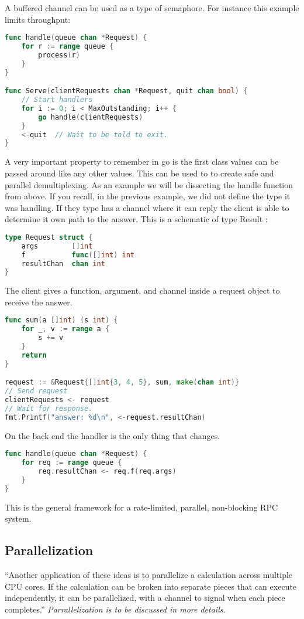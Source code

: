 	A buffered channel can be used as a type of semaphore. For instance this example limits throughput:
\begin{lstlisting}[language=Go]
func handle(queue chan *Request) {
    for r := range queue {
        process(r)
    }
}

func Serve(clientRequests chan *Request, quit chan bool) {
    // Start handlers
    for i := 0; i < MaxOutstanding; i++ {
        go handle(clientRequests)
    }
    <-quit  // Wait to be told to exit.
} 
\end{lstlisting}
A very important property to remember in go is the first class values can be passed around like any other values. This can be used to to create safe and parallel demultiplexing. As an example we will be dissecting the handle function from above. If you recall, in the previous example, we did not define the type it was handling. If they type has a channel where it can reply the client is able to determine it own path to the answer. This is a schematic of type Result :
\begin{lstlisting}[language=Go]
type Request struct {
    args        []int
    f           func([]int) int
    resultChan  chan int
} 
\end{lstlisting}
The client gives a function, argument, and channel inside a request object to receive the answer.
\begin{lstlisting}[language=Go]
func sum(a []int) (s int) {
    for _, v := range a {
        s += v
    }
    return
}

request := &Request{[]int{3, 4, 5}, sum, make(chan int)}
// Send request
clientRequests <- request
// Wait for response.
fmt.Printf("answer: %d\n", <-request.resultChan)
\end{lstlisting}
On the back end the handler is the only thing that changes. 
\begin{lstlisting}[language=Go]
func handle(queue chan *Request) {
    for req := range queue {
        req.resultChan <- req.f(req.args)
    }
} 
\end{lstlisting}
This is the general framework for a rate-limited, parallel, non-blocking RPC system.
\subsection{Parallelization}
“Another application of these ideas is to parallelize a calculation across multiple CPU cores. If the calculation can be broken into separate pieces that can execute independently, it can be parallelized, with a channel to signal when each piece completes.”\cite{website:go-lang-documentation}
\emph{Parrallelization is to be discussed in more details.}


